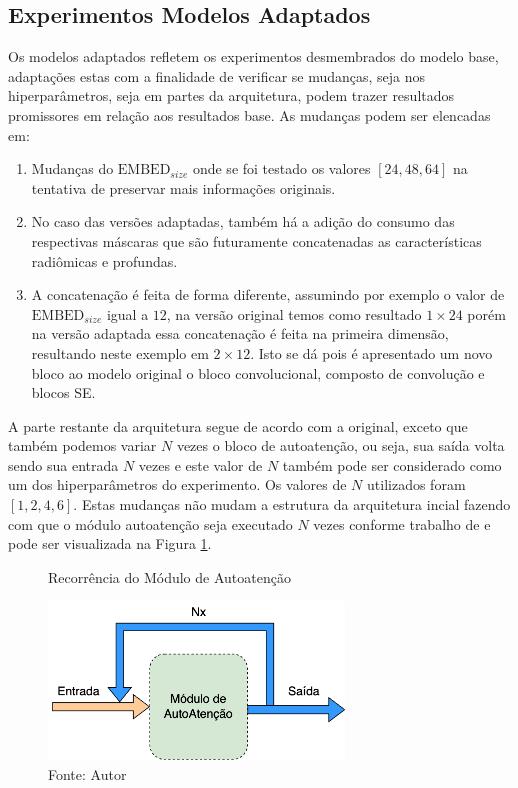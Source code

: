 \subsection{Experimentos Modelos Adaptados}
\label{subsec:cap5_experimentos_adaptados}

Os modelos adaptados refletem os experimentos desmembrados do modelo base, adaptações estas com a finalidade de verificar se mudanças, seja nos hiperparâmetros, seja em partes da arquitetura, podem trazer resultados promissores em relação aos resultados base. As mudanças podem ser elencadas em: 

\begin{enumerate}

\item Mudanças do $\text{EMBED}_{size}$ onde se foi testado os valores $[24, 48, 64]$ na tentativa de preservar mais informações originais.

\item No caso das versões adaptadas, também há a adição do consumo das respectivas máscaras que são futuramente concatenadas as características radiômicas e profundas.

\item A concatenação é feita de forma diferente, assumindo por exemplo o valor de $\text{EMBED}_{size}$ igual a $12$, na versão original temos como resultado $1\times24$ porém na versão adaptada essa concatenação é feita na primeira dimensão, resultando neste exemplo em $2\times12$. Isto se dá pois é apresentado um novo bloco ao modelo original o bloco convolucional, composto de convolução e blocos \gls{SE}.

\end{enumerate}


A parte restante da arquitetura segue de acordo com a original, exceto que também podemos variar $N$ vezes o bloco de autoatenção, ou seja, sua saída volta sendo sua entrada $N$ vezes e este valor de $N$ também pode ser considerado como um dos hiperparâmetros do experimento. Os valores de $N$ utilizados foram $[1, 2, 4, 6]$. Estas mudanças não mudam a estrutura da arquitetura incial fazendo com que o módulo autoatenção seja executado $N$ vezes conforme trabalho de \cite{vaswaniAttentionAllYou2023} e pode ser visualizada na Figura \ref{fig:fig030}.
\newline

\begin{figure}[h!]
    \centering
    \caption{Recorrência do Módulo de Autoatenção}
    \includegraphics[width=0.7\textwidth]{figures/fig030.png}
    \caption*{Fonte: Autor}
    \label{fig:fig030}
\end{figure}




